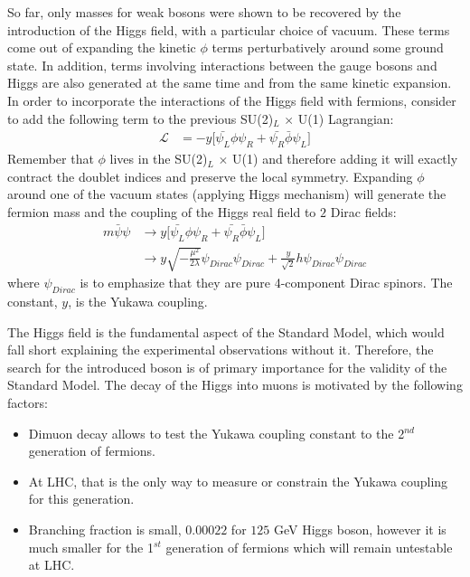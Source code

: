 So far, only masses for weak bosons were shown to be recovered by the introduction of the Higgs field, with a particular choice of vacuum. These terms come out of expanding the kinetic $\phi$ terms perturbatively around some ground state. In addition, terms involving interactions between the gauge bosons and Higgs are also generated at the same time and from the same kinetic expansion. In order to incorporate the interactions of the Higgs field with fermions, consider to add the following term to the previous SU(2)$_L$ $\times$ U(1) Lagrangian:
\begin{subequations}\label{eq:higgs_introduction_fermionmasses}
\begin{align}
    \mathcal{L}& = - y \lbrack \bar{\psi_L}\phi\psi_R + \bar{\psi_R}\bar{\phi}\psi_L \rbrack
\end{align}
\end{subequations}
Remember that $\phi$ lives in the SU(2)$_L$ $\times$ U(1) and therefore adding it will exactly contract the doublet indices and preserve the local symmetry. Expanding $\phi$ around one of the vacuum states (applying Higgs mechanism) will generate the fermion mass and the coupling of the Higgs real field to $2$ Dirac fields:
\begin{subequations}\label{eq:higgs_introduction_fermionmassterms}
\begin{align}
    m\bar{\psi}\psi& \rightarrow y \lbrack \bar{\psi_L}\phi\psi_R + \bar{\psi_R}\bar{\phi}\psi_L \rbrack\\
    & \rightarrow y\sqrt{-\frac{\mu^2}{2\lambda}}\psi_{Dirac}\psi_{Dirac} + \frac{y}{\sqrt{2}}h\psi_{Dirac}\psi_{Dirac}
\end{align}
\end{subequations}
where $\psi_{Dirac}$ is to emphasize that they are pure 4-component Dirac spinors. The constant, $y$, is the Yukawa coupling.

The Higgs field is the fundamental aspect of the Standard Model, which would fall short explaining the experimental observations without it. Therefore, the search for the introduced boson is of primary importance for the validity of the Standard Model. The decay of the Higgs into muons is motivated by the following factors:
\begin{itemize}
    \item Dimuon decay allows to test the Yukawa coupling constant to the 2$^{nd}$ generation of fermions.
    \item At LHC, that is the only way to measure or constrain the Yukawa coupling for this generation.
    \item Branching fraction is small, $0.00022$ for $125$ GeV Higgs boson, however it is much smaller for the 1$^{st}$ generation of fermions which will remain untestable at LHC.
\end{itemize}